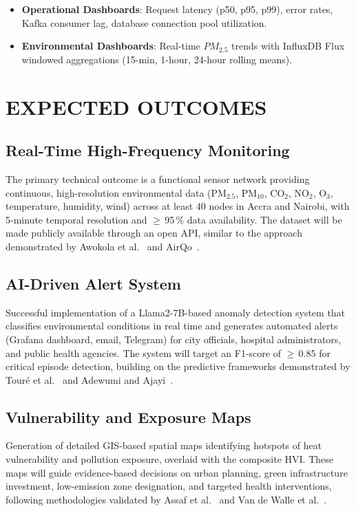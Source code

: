 \begin{itemize}[nosep]
    \item \textbf{Operational Dashboards}: Request latency (p50, p95, p99), error rates, Kafka consumer lag, database connection pool utilization.
    \item \textbf{Environmental Dashboards}: Real-time $PM_{2.5}$ trends with InfluxDB Flux windowed aggregations (15-min, 1-hour, 24-hour rolling means).
\end{itemize}

\figMethodologyMonitoring

\chapter{EXPECTED OUTCOMES}

\section{Real-Time High-Frequency Monitoring}
The primary technical outcome is a functional sensor network providing continuous, high-resolution environmental data (PM$_{2.5}$, PM$_{10}$, CO$_2$, NO$_2$, O$_3$, temperature, humidity, wind) across at least 40 nodes in Accra and Nairobi, with 5-minute temporal resolution and $\geq$\,95\,\% data availability. The dataset will be made publicly available through an open API, similar to the approach demonstrated by Awokola et al.~\cite{awokola2022} and AirQo~\cite{bainomugisha2024}.

\section{AI-Driven Alert System}
Successful implementation of a Llama2-7B-based anomaly detection system that classifies environmental conditions in real time and generates automated alerts (Grafana dashboard, email, Telegram) for city officials, hospital administrators, and public health agencies. The system will target an F1-score of $\geq$\,0.85 for critical episode detection, building on the predictive frameworks demonstrated by Touré et al.~\cite{toure2024} and Adewumi and Ajayi~\cite{adewumi2025}.

\section{Vulnerability and Exposure Maps}
Generation of detailed GIS-based spatial maps identifying hotspots of heat vulnerability and pollution exposure, overlaid with the composite HVI. These maps will guide evidence-based decisions on urban planning, green infrastructure investment, low-emission zone designation, and targeted health interventions, following methodologies validated by Assaf et al.~\cite{assaf2023} and Van de Walle et al.~\cite{vandewalle2021}.

